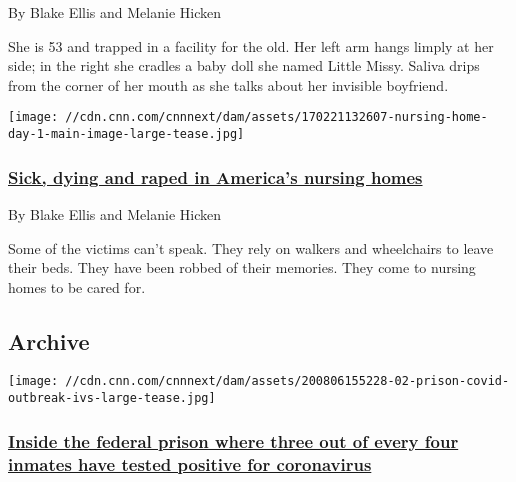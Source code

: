 By Blake Ellis and Melanie Hicken

She is 53 and trapped in a facility for the old. Her left arm hangs
limply at her side; in the right she cradles a baby doll she named
Little Missy. Saliva drips from the corner of her mouth as she talks
about her invisible boyfriend.

\href{https://www.cnn.com/interactive/2017/02/health/nursing-home-sex-abuse-investigation/}{}

\texttt{[image: //cdn.cnn.com/cnnnext/dam/assets/170221132607-nursing-home-day-1-main-image-large-tease.jpg]}

\hypertarget{sick-dying-and-raped-in-americas-nursing-homes}{%
\subsubsection{\texorpdfstring{\href{https://www.cnn.com/interactive/2017/02/health/nursing-home-sex-abuse-investigation/}{Sick,
dying and raped in America's nursing
homes}}{Sick, dying and raped in America's nursing homes}}\label{sick-dying-and-raped-in-americas-nursing-homes}}

By Blake Ellis and Melanie Hicken

Some of the victims can't speak. They rely on walkers and wheelchairs to
leave their beds. They have been robbed of their memories. They come to
nursing homes to be cared for.

\hypertarget{archive}{%
\subsection{Archive}\label{archive}}

\href{/2020/08/08/us/federal-prison-coronavirus-outbreak-invs/index.html}{}

\texttt{[image: //cdn.cnn.com/cnnnext/dam/assets/200806155228-02-prison-covid-outbreak-ivs-large-tease.jpg]}

\hypertarget{inside-the-federal-prison-where-three-out-of-every-four-inmates-have-tested-positive-for-coronavirus}{%
\subsubsection{\texorpdfstring{\href{/2020/08/08/us/federal-prison-coronavirus-outbreak-invs/index.html}{Inside
the federal prison where three out of every four inmates have tested
positive for
coronavirus}}{Inside the federal prison where three out of every four inmates have tested positive for coronavirus}}\label{inside-the-federal-prison-where-three-out-of-every-four-inmates-have-tested-positive-for-coronavirus}}

